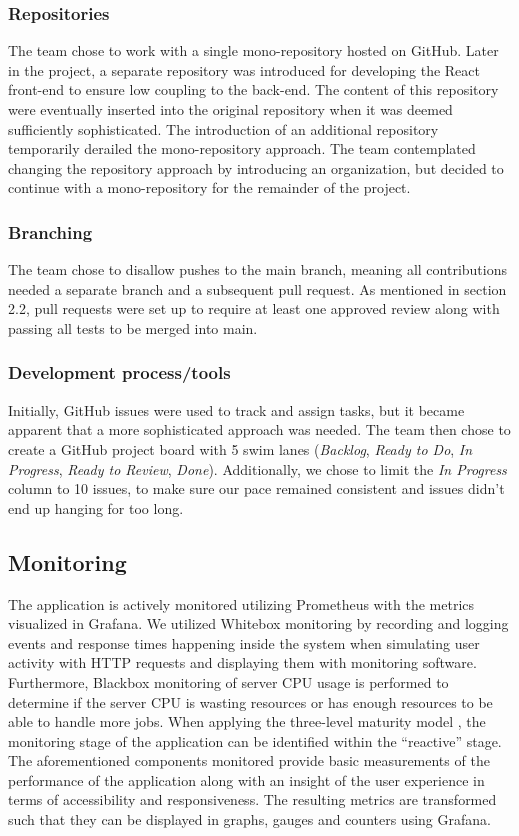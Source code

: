 \subsubsection{Repositories}
The team chose to work with a single mono-repository hosted on GitHub. Later in the project, a separate repository was introduced for developing the React front-end to ensure low coupling to the back-end. The content of this repository were eventually inserted into the original repository when it was deemed sufficiently sophisticated. The introduction of an additional repository temporarily derailed the mono-repository approach. The team contemplated changing the repository approach by introducing an organization, but decided to continue with a mono-repository for the remainder of the project.

\subsubsection{Branching}
The team chose to disallow pushes to the main branch, meaning all contributions needed a separate branch and a subsequent pull request. As mentioned in section 2.2, pull requests were set up to require at least one approved review along with passing all tests to be merged into main.

\subsubsection{Development process/tools}
Initially, GitHub issues were used to track and assign tasks, but it became apparent that a more sophisticated approach was needed. The team then chose to create a GitHub project board with 5 swim lanes (\textit{Backlog}, \textit{Ready to Do}, \textit{In Progress}, \textit{Ready to Review}, \textit{Done}). Additionally, we chose to limit the \textit{In Progress} column to 10 issues, to make sure our pace remained consistent and issues didn't end up hanging for too long. 

\subsection{Monitoring}
The application is actively monitored utilizing Prometheus with the metrics visualized in Grafana. 
We utilized Whitebox monitoring by recording and logging events and response times happening inside the system when simulating user activity with HTTP requests and displaying them with monitoring software. Furthermore, Blackbox monitoring of server CPU usage is performed to determine if the server CPU is wasting resources or has enough resources to be able to handle more jobs.
When applying the three-level maturity model \cite{monitoringmaturitymodel}, the monitoring stage of the application can be identified within the “reactive” stage. The aforementioned components monitored provide basic measurements of the performance of the application along with an insight of the user experience in terms of accessibility and responsiveness. The resulting metrics are transformed such that they can be displayed in graphs, gauges and counters using Grafana.


